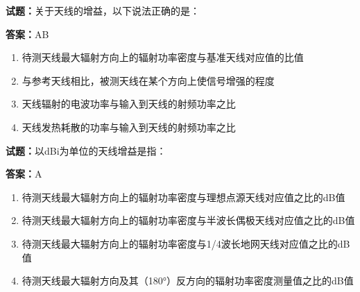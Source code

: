 \documentclass{ctexbook}
\begin{document}




\vspace{1em}

\textbf{试题：}关于天线的增益，以下说法正确的是： 

\textbf{答案：}AB 

\begin{enumerate}[leftmargin=3em]
  \item 待测天线最大辐射方向上的辐射功率密度与基准天线对应值的比值 

  \item 与参考天线相比，被测天线在某个方向上使信号增强的程度 

  \item 天线辐射的电波功率与输入到天线的射频功率之比 

  \item 天线发热耗散的功率与输入到天线的射频功率之比 

\end{enumerate}





\vspace{1em}

\textbf{试题：}以dBi为单位的天线增益是指： 

\textbf{答案：}A 

\begin{enumerate}[leftmargin=3em]
  \item 待测天线最大辐射方向上的辐射功率密度与理想点源天线对应值之比的dB值 

  \item 待测天线最大辐射方向上的辐射功率密度与半波长偶极天线对应值之比的dB值 


  \item 待测天线最大辐射方向上的辐射功率密度与1/4波长地网天线对应值之比的dB值 

  \item 待测天线最大辐射方向及其（180°）反方向的辐射功率密度测量值之比的dB值 

\end{enumerate}





\vspace{1em}
\end{document}

